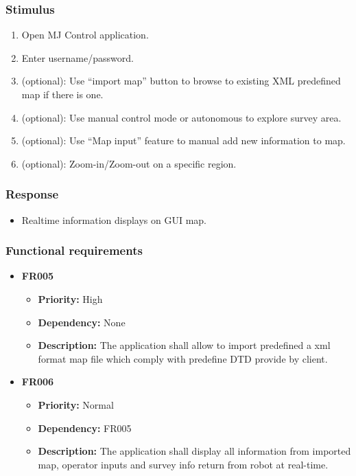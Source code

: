 \documentclass[10pt,a4paper,titlepage]{article}
\begin{document}
	\subsubsection*{Stimulus}
	\begin{enumerate}
		\item Open MJ Control application.
		\item Enter username/password.
		\item (optional): Use “import map” button to browse to existing XML predefined map if there is one.
		\item (optional): Use manual control mode or autonomous to explore survey area.
		\item (optional): Use “Map input” feature to manual add new information to map.
		\item (optional): Zoom-in/Zoom-out on a specific region.  
	\end{enumerate}
	
	\subsubsection*{Response}
	\begin{itemize}
		\item Realtime information displays on GUI map.
	\end{itemize}
	
	\subsubsection*{Functional requirements}
	\begin{itemize}
		
		\item \textbf{FR005} 
		\begin{itemize}
			\item \textbf{Priority:} High
			\item \textbf{Dependency:} None
			\item \textbf{Description:} The application shall allow to import predefined a xml format map file which comply with predefine DTD provide by client.
		\end{itemize}
		\item \textbf{FR006} 
		\begin{itemize}
		\item \textbf{Priority:} Normal
		\item \textbf{Dependency:} FR005
		\item \textbf{Description:} The application shall display all information from imported map, operator inputs and survey info return from robot at real-time.
		\end{itemize}
	
	\end{itemize}
	
\end{document}

